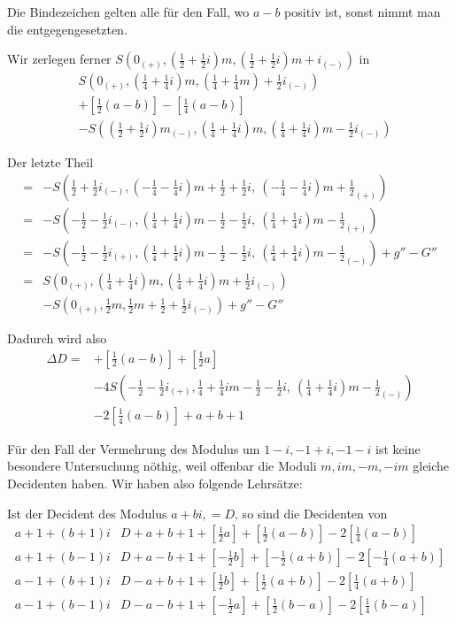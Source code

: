 Die Bindezeichen gelten alle für den Fall, wo $a-b$ positiv ist, sonst nimmt man die entgegengesetzten.

Wir zerlegen ferner $S(0_{(+)},(\frac12+\frac12i)m,(\frac12+\frac12i)m+i_{(-)})$ in
\[
\begin{aligned}
&S(0_{(+)},(\tfrac14+\tfrac14i)m,(\tfrac14+\tfrac14m)+\tfrac12i_{(-)})\\
&+\left[\tfrac12(a-b)\right]-\left[\tfrac14(a-b)\right]\\
&-S((\tfrac12+\tfrac12i)m_{(-)},(\tfrac14+\tfrac14i)m,(\tfrac14+\tfrac14i)m-\tfrac12i_{(-)})
\end{aligned}
\]

%
Der letzte Theil
\[
\begin{aligned}
={}&-S(\tfrac12+\tfrac12i_{(-)},(-\tfrac14-\tfrac14i)m+\tfrac12+\tfrac12i,\ (-\tfrac14-\tfrac14i)m+\tfrac12_{(+)})\\
={}&-S(-\tfrac12-\tfrac12i_{(-)},(\tfrac14+\tfrac14i)m-\tfrac12-\tfrac12i,\ (\tfrac14+\tfrac14i)m-\tfrac12_{(+)})\\
={}&-S(-\tfrac12-\tfrac12i_{(+)},(\tfrac14+\tfrac14i)m-\tfrac12-\tfrac12i,\ (\tfrac14+\tfrac14i)m-\tfrac12_{(-)})+g''-G''\\
={}&S(0_{(+)},(\tfrac14+\tfrac14i)m,(\tfrac14+\tfrac14i)m+\tfrac12i_{(-)})\\
&-S(0_{(+)},\tfrac12m,\tfrac12m+\tfrac12+\tfrac12i_{(-)})+g''-G''
\end{aligned}
\]

Dadurch wird also
\[
\begin{aligned}
\Delta D={}&+\left[\tfrac12(a-b)\right]+\left[\tfrac12a\right]\\
&-4S(-\tfrac12-\tfrac12i_{(+)},\tfrac14+\tfrac14im-\tfrac12-\tfrac12i,\ (\tfrac14+\tfrac14i)m-\tfrac12_{(-)})\\
&-2\left[\tfrac14(a-b)\right]+a+b+1
\end{aligned}
\]

Für den Fall der Vermehrung des Modulus um $1-i,-1+i,-1-i$ ist keine besondere Untersuchung nöthig, weil offenbar die Moduli $m,im,-m,-im$ gleiche Decidenten haben. Wir haben also folgende Lehrsätze:

Ist der Decident des Modulus $a+bi,=D$, so sind die Decidenten von
{\small
\[
\begin{array}{l|l}
a+1+(b+1)i&D+a+b+1+[\tfrac12a]+[\tfrac12(a-b)]-2[\tfrac14(a-b)]\\
a+1+(b-1)i&D+a-b+1+[-\tfrac12b]+[-\tfrac12(a+b)]-2[-\tfrac14(a+b)]\\
a-1+(b+1)i&D-a+b+1+[\tfrac12b]+[\tfrac12(a+b)]-2[\tfrac14(a+b)]\\
a-1+(b-1)i&D-a-b+1+[-\tfrac12a]+[\tfrac12(b-a)]-2[\tfrac14(b-a)]
\end{array}
\]
}

